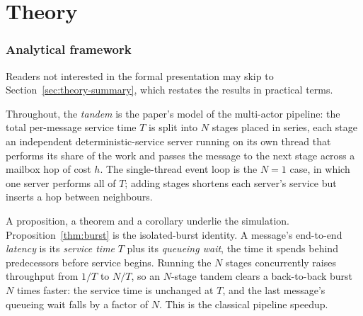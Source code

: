 \documentclass[11pt]{article}
\begin{document}


\clearpage
\part{Theory}

\section{Analytical framework}
\label{sec:theory}

Readers not interested in the formal presentation may skip to
Section~\ref{sec:theory-summary}, which restates the results in practical terms.

Throughout, the \emph{tandem} is the paper's model of the multi-actor pipeline: the total
per-message service time $T$ is split into $N$ stages placed in series, each stage an
independent deterministic-service server running on its own thread that performs its share
of the work and passes the message to the next stage across a mailbox hop of cost $h$. The
single-thread event loop is the $N = 1$ case, in which one server performs all of $T$;
adding stages shortens each server's service but inserts a hop between neighbours.

A proposition, a theorem and a corollary underlie the simulation. Proposition~\ref{thm:burst}
is the isolated-burst identity. A message's end-to-end \emph{latency} is its
\emph{service time} $T$ plus its \emph{queueing wait}, the time it spends behind
predecessors before service begins. Running the $N$ stages concurrently raises throughput
from $1/T$ to $N/T$, so an $N$-stage tandem clears a back-to-back burst $N$ times faster:
the service time is unchanged at $T$, and the last message's queueing wait falls by a
factor of $N$. This is the classical pipeline speedup.
\end{document}
